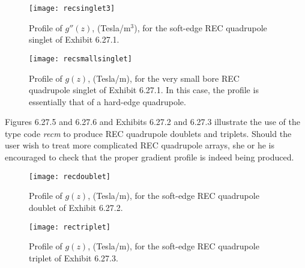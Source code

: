 \newpage
\begin{figure}[h]
  \centering
  \texttt{[image: recsinglet3]}
  \caption{Profile of $g''(z)$, (Tesla/$\mbox{m}^3$), for the soft-edge REC quadrupole singlet of Exhibit 6.27.1.}
\end{figure}

\begin{figure}[h]
  \centering
  \texttt{[image: recsmallsinglet]}
  \caption{Profile of $g(z)$, (Tesla/m), for the very small bore REC quadrupole singlet of Exhibit 6.27.1.  In this case, the profile is essentially that of a hard-edge quadrupole.}
\end{figure}

\newpage
Figures 6.27.5 and 6.27.6 and Exhibits 6.27.2 and 6.27.3 illustrate the use of the type code {\em recm} to produce REC quadrupole doublets and triplets.  Should the user wish to treat more complicated REC quadrupole arrays, she or he is encouraged to check that the proper gradient profile is indeed being produced. 

\newpage
\begin{figure}[h]
  \centering
  \texttt{[image: recdoublet]}
  \caption{Profile of $g(z)$, (Tesla/m), for the soft-edge REC quadrupole doublet of Exhibit 6.27.2.}
\end{figure}

\begin{figure}[h]
  \centering
  \texttt{[image: rectriplet]}
  \caption{Profile of $g(z)$, (Tesla/m), for the soft-edge REC quadrupole triplet of Exhibit 6.27.3.}
\end{figure}

